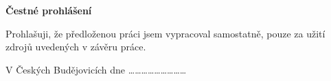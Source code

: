 \null
\thispagestyle{empty}
\textbf{Čestné prohlášení}

Prohlašuji, že předloženou práci jsem vypracoval samostatně,
pouze za užití zdrojů uvedených v závěru práce.

\begin{multicols}{2}
V Českých Budějovicích dne
\columnbreak
\flushright \ldots \ldots \ldots \ldots \ldots \ldots \ldots \ldots \ldots
\end{multicols}